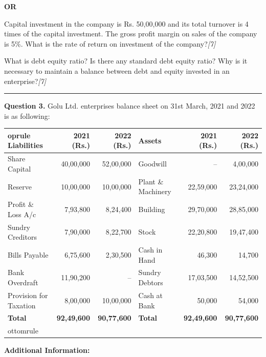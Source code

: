 \documentclass[11pt,a4paper]{article}
\newcommand{\pts}[1]{\hfill   \textit{[#1]}}
\begin{document}
\centerline{   \textbf{OR}}


\begin{parts}
  \item Capital investment in the company is Rs. 50,00,000 and its total turnover is 4 times of the capital investment. The gross profit margin on sales of the company is 5\%. What is the rate of return on investment of the company?\pts{7}
  \item What is debt equity ratio? Is there any standard debt equity ratio? Why is it necessary to maintain a balance between debt and equity invested in an enterprise?\pts{7}
\end{parts}

\medskip\rule{\linewidth}{0.2pt}


\newpage



\noindent   \textbf{Question 3.}
Golu Ltd. enterprises balance sheet on 31st March, 2021 and 2022 is as following:


\begin{center}

\begin{tabular}{lrr@{\qquad}lrr}
   oprule
   \textbf{Liabilities} &   \textbf{2021 (Rs.)} &   \textbf{2022 (Rs.)} &   \textbf{Assets} &   \textbf{2021 (Rs.)} &   \textbf{2022 (Rs.)} \\
  \midrule
  Share Capital & 40,00,000 & 52,00,000 & Goodwill & -- & 4,00,000 \\
  Reserve & 10,00,000 & 10,00,000 & Plant \& Machinery & 22,59,000 & 23,24,000 \\
  Profit \& Loss A/c & 7,93,800 & 8,24,400 & Building & 29,70,000 & 28,85,000 \\
  Sundry Creditors & 7,90,000 & 8,22,700 & Stock & 22,20,800 & 19,47,400 \\
  Bills Payable & 6,75,600 & 2,30,500 & Cash in Hand & 46,300 & 14,700 \\
  Bank Overdraft & 11,90,200 & -- & Sundry Debtors & 17,03,500 & 14,52,500 \\
  Provision for Taxation & 8,00,000 & 10,00,000 & Cash at Bank & 50,000 & 54,000 \\
  \midrule
   \textbf{Total} &   \textbf{92,49,600} &   \textbf{90,77,600} &   \textbf{Total} &   \textbf{92,49,600} &   \textbf{90,77,600} \\
  ottomrule
\end{tabular}
\end{center}

   \textbf{Additional Information:}
\end{document}
